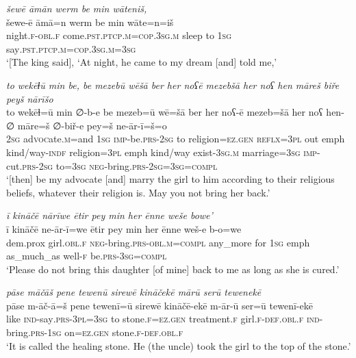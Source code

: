 \ea \label{ZP.32}
\textit{šewē āmān werm be min wāteniš,} \\ 
\gll šewe-ē āmā=n werm be min wāte=n=iš \\ 
 night\textsc{.f}\textsc{-obl}\textsc{.f} come\textsc{.pst}\textsc{.ptcp}\textsc{.m}\textsc{=cop}\textsc{.3sg}\textsc{.m} sleep to \textsc{1sg} say\textsc{.pst}\textsc{.ptcp}\textsc{.m}\textsc{=cop}\textsc{.3sg}\textsc{.m}\textsc{=3sg} \\ 
\glt `[The king said], ‘At night, he came to my dream [and] told me,'
\z 
 
\ea \label{ZP.47}
\textit{to wekēɫū min be, be mezebū wēšā ber her noʕē mezebšā her noʕ hen māreš biře peyš nārīšo} \\ 
\gll to wekēɫ=ū min ∅-b-e be mezeb=ū wē=šā ber her noʕ-ē mezeb=šā her noʕ hen-∅ māre=š ∅-biř-e pey=š ne-ār-ī=š=o \\ 
 \textsc{2sg} ad\textsc{voc}ate\textsc{.m}=and \textsc{1sg} \textsc{imp-}be\textsc{.prs}-\textsc{2sg} to religion\textsc{\textsc{=ez.gen}} \textsc{reflx}\textsc{=3pl} out emph kind/way\textsc{-indf} religion\textsc{=3pl} emph kind/way exist\textsc{-3sg}\textsc{.m} marriage\textsc{=3sg} \textsc{imp-}cut\textsc{.prs}-\textsc{2sg} to\textsc{=3sg} \textsc{neg-}bring\textsc{.prs}\textsc{-2sg}\textsc{=3sg}\textsc{=compl} \\ 
\glt `[then] be my advocate [and] marry the girl to him according to their religious beliefs, whatever their religion is. May you not bring her back.'
\z 
 
\ea \label{ZP.48}
\textit{ī kināčē nārīwe ētir pey min her ēnne weše bowe’} \\ 
\gll ī kināčē ne-ār-ī=we ētir pey min her ēnne weš-e b-o=we \\ 
 dem.prox girl\textsc{.obl}\textsc{.f} \textsc{neg-}bring\textsc{.prs}\textsc{-obl}\textsc{.m}\textsc{=compl} any\_more for \textsc{1sg} emph as\_much\_as well\textsc{-f} be\textsc{.prs}\textsc{-3sg}\textsc{=compl} \\ 
\glt `Please do not bring this daughter [of mine] back to me as long as she is cured.'
\z 
 
\ea \label{ZP.52}
\textit{pāse māčāš pene tewenū sirewē kināčekē mārū serū tewenekē} \\ 
\gll pāse m-āč-ā=š pene tewenī=ū sirewē kināčē-ekē m-ār-ū ser=ū tewenī-ekē \\ 
 like \textsc{ind-}say\textsc{.prs}\textsc{-3pl}\textsc{=3sg} to stone\textsc{.f}\textsc{\textsc{=ez.gen}} treatment\textsc{.f} girl\textsc{.f}\textsc{-def}\textsc{.obl}\textsc{.f} \textsc{ind-}bring\textsc{.prs}\textsc{-\textsc{1sg}} on\textsc{\textsc{=ez.gen}} stone\textsc{.f}\textsc{-def}\textsc{.obl}\textsc{.f} \\ 
\glt `It is called the healing stone. He (the uncle) took the girl to the top of the stone.'
\z 
 
